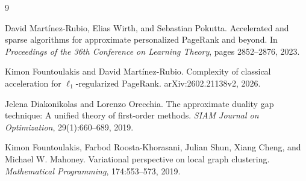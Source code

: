 \documentclass[11pt]{article}
\begin{document}
\footnotesize
\begin{thebibliography}{9}

David Mart\'inez-Rubio, Elias Wirth, and Sebastian Pokutta.
\newblock Accelerated and sparse algorithms for approximate personalized
PageRank and beyond.
\newblock In \emph{Proceedings of the 36th Conference on Learning Theory},
pages 2852--2876, 2023.

Kimon Fountoulakis and David Mart\'inez-Rubio.
\newblock Complexity of classical acceleration for
$\ell_1$-regularized PageRank.
\newblock arXiv:2602.21138v2, 2026.

Jelena Diakonikolas and Lorenzo Orecchia.
\newblock The approximate duality gap technique: A unified theory of
first-order methods.
\newblock \emph{SIAM Journal on Optimization}, 29(1):660--689, 2019.

Kimon Fountoulakis, Farbod Roosta-Khorasani, Julian Shun, Xiang Cheng, and
Michael W. Mahoney.
\newblock Variational perspective on local graph clustering.
\newblock \emph{Mathematical Programming}, 174:553--573, 2019.

\end{thebibliography}
\end{document}
